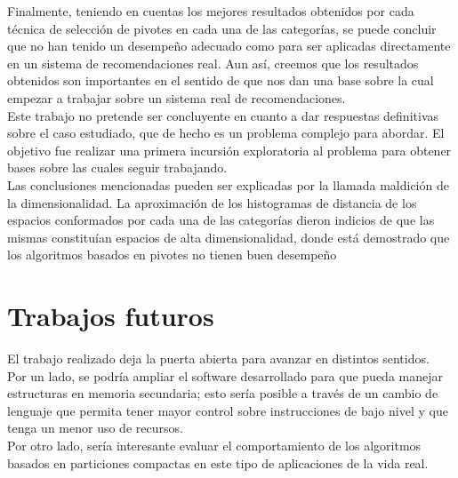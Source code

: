 Finalmente, teniendo en cuentas los mejores resultados obtenidos por cada t\'ecnica de selecci\'on de pivotes en cada una de las categor\'ias, se puede concluir que no han tenido un desempeño adecuado como  para ser aplicadas directamente en un sistema de recomendaciones real. Aun as\'i, creemos que los resultados obtenidos son importantes en el sentido de que nos dan una  base sobre la cual empezar a trabajar sobre un sistema real de recomendaciones.\\

Este trabajo no pretende ser concluyente en cuanto a dar respuestas definitivas sobre el caso estudiado, que de hecho es un problema complejo para abordar. El objetivo fue realizar una primera incursi\'on exploratoria al problema para obtener bases sobre las cuales seguir trabajando.\\

Las conclusiones mencionadas pueden ser explicadas por la llamada maldici\'on de la dimensionalidad. La aproximaci\'on de los histogramas de distancia de los espacios conformados por cada una de las categor\'ias dieron indicios de que las mismas constitu\'ian espacios de alta dimensionalidad, donde est\'a demostrado que los algoritmos basados en pivotes no tienen buen desempeño \cite{BNCsccc01}\\

\section{Trabajos futuros}

El trabajo realizado deja la puerta abierta para avanzar en distintos sentidos.\\

Por un lado, se podr\'ia ampliar el software desarrollado para que pueda manejar estructuras en memoria secundaria; esto ser\'ia posible a trav\'es de un cambio de lenguaje que permita tener mayor control sobre instrucciones de bajo nivel y que tenga un menor uso de recursos.\\

Por otro lado, ser\'ia interesante evaluar el comportamiento de los algoritmos basados en particiones compactas en este tipo de aplicaciones de la vida real.
